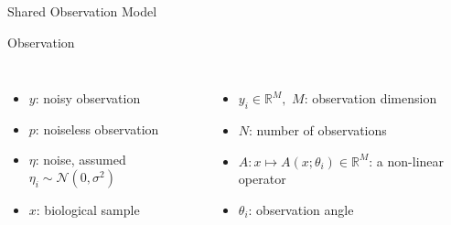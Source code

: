 \begin{frame}{Shared Observation Model}
    \pause

    \begin{block}{Observation}
        

    \end{block}
    \begin{columns}[T]

    
    \begin{itemize}
        \item<2-> \alert<2>{$y$: noisy observation}
        \item<2-> \alert<2>{$p$: noiseless observation}
        \item<2-> \alert<2>{$\eta$: noise, assumed  $\eta_i \sim \mathcal{N}(0,\sigma^2)$}
        \item<3-> \alert<3>{$x$: biological sample}
    \end{itemize}
        

    \begin{itemize}
        \item<2-> \alert<2>{$y_i \in \mathbb{R}^M, $ $M$: observation dimension}
        \item<2-> \alert<2>{$N$: number of observations}
        \item<3-> \alert<3>{$A: x \mapsto A(x; \theta_i) \in \mathbb{R}^M$: a non-linear operator}
        \item<3-> \alert<3>{$\theta_i$: observation angle}
    \end{itemize}

    \end{columns}
    
\end{frame}

